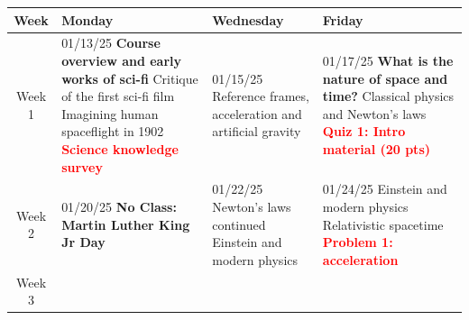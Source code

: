 \documentclass[11pt]{article}
\begin{document}

\begin{tabularx}{\textwidth}{|c|X|X|X|}
    \hline
    \textbf{Week} & \textbf{Monday} & \textbf{Wednesday} & \textbf{Friday} \\
    \hline
    Week 1 & 
    
    01/13/25 \newline
    \textbf{Course overview and early works of sci-fi} \newline
    Critique of the first sci-fi film \newline
    Imagining human spaceflight in 1902\newline
    \textcolor{red}{\textbf{Science knowledge survey}} &
    
    01/15/25 \newline
    \newline
    Reference frames, acceleration and \newline
    artificial gravity &

    01/17/25 \newline
    \textbf{What is the nature of space and time?} \newline
    Classical physics and Newton's laws \newline
    \newline
    \textcolor{red}{\textbf{Quiz 1: Intro material (20 pts)}} \\


    \hline
    Week 2 & 

    \cellcolor{gray!20}01/20/25 \newline
    \newline
    \textbf{No Class: Martin Luther King Jr Day} \newline
    \newline
     &
    
    01/22/25 \newline
    \newline
    Newton's laws continued \newline
    Einstein and modern physics\ &

    01/24/25  \newline
    \newline
    Einstein and modern physics \newline
    Relativistic spacetime \newline
    \textcolor{red}{\textbf{Problem 1: acceleration}} \\


    \hline
    Week 3 & 


\end{tabularx}
\end{document}
